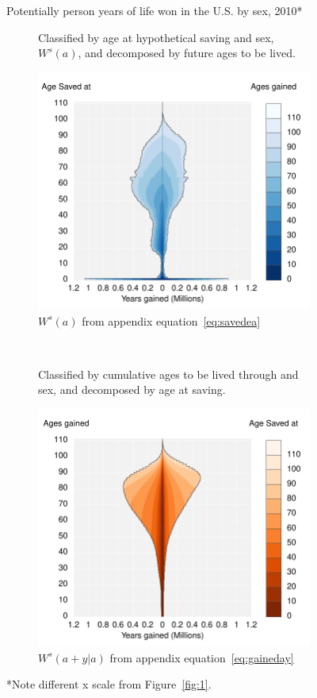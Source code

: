 \documentclass{article}
\begin{document}
\begin{figure}
\centering
\caption{Potentially person years of life won in the U.S. by sex, 2010*}
\label{fig:2}
\begin{subfigure}[b]{.48\linewidth}
\centering
	\caption{Classified by age at hypothetical saving and sex, $W^s(a)$, and
	decomposed by future ages to be lived.}
	\label{fig:SavedGained}
	\includegraphics[scale=.55]{Figures/YearsSavedGainedxx10.pdf}
	\caption*{$W^s(a)$ from appendix equation~\ref{eq:savedea}}	
\end{subfigure}
~
\begin{subfigure}[b]{.48\linewidth}
\centering
    \caption{Classified by cumulative ages to be lived through and sex, and
    decomposed by age at saving.}
	\label{fig:LostLived}
    \includegraphics[scale=.55]{Figures/YearsLostLivedyx10.pdf}
    \caption*{$W^s(a+y|a)$ from appendix equation~\ref{eq:gaineday}}	
\end{subfigure}
\caption*{*Note different x scale from Figure~\ref{fig:1}.}
\end{figure}
\end{document}
